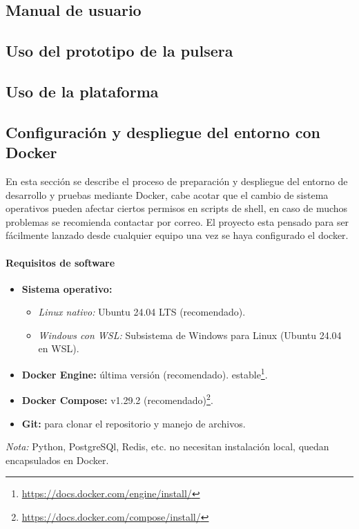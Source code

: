 \documentclass[12pt, a4paper]{article}
\begin{document}
\begin{umaappendices}
	
	\section{Manual de usuario}
	
	\subsection{Uso del prototipo de la pulsera}
	
	\subsection{Uso de la plataforma}
	
	\subsection{Configuración y despliegue del entorno con Docker}
	\label{sec:deploy_docker}
	
	En esta sección se describe el proceso de preparación y despliegue del entorno de desarrollo y pruebas mediante Docker, cabe acotar que el cambio de sistema operativos pueden afectar ciertos permisos en scripts de shell, en caso de muchos problemas se recomienda contactar por correo. El proyecto esta pensado para ser fácilmente lanzado desde cualquier equipo una vez se haya configurado el docker.
	
	\paragraph{Requisitos de software}
	\begin{itemize}
		\item \textbf{Sistema operativo:}
		\begin{itemize}
			\item \emph{Linux nativo:} Ubuntu 24.04 LTS (recomendado).  
			\item \emph{Windows con WSL:} Subsistema de Windows para Linux (Ubuntu 24.04 en WSL).  
		\end{itemize}
		\item \textbf{Docker Engine:} última versión (recomendado). estable\footnote{\url{https://docs.docker.com/engine/install/}}.  
		\item \textbf{Docker Compose:} v1.29.2 (recomendado)\footnote{\url{https://docs.docker.com/compose/install/}}.  
		\item \textbf{Git:} para clonar el repositorio y manejo de archivos.  
	\end{itemize}
	\emph{Nota:} Python, PostgreSQl, Redis, etc. no necesitan instalación local, quedan encapsulados en Docker.
	

\end{umaappendices}
\end{document}
